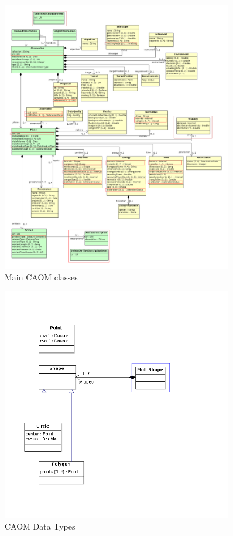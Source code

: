\documentclass[11pt,a4paper]{ivoa}
\begin{document}
\begin{figure}
\centering
\includegraphics[width=0.9\textwidth]{src/uml/CAOM1core.png}
\caption{Main CAOM classes}
\label{fig:core}
\end{figure}

\begin{figure}
\centering
\includegraphics[width=0.9\textwidth]{src/uml/CAOM2datatypes.png}
\caption{CAOM Data Types}
\label{fig:datatypes}
\end{figure}
\end{document}

